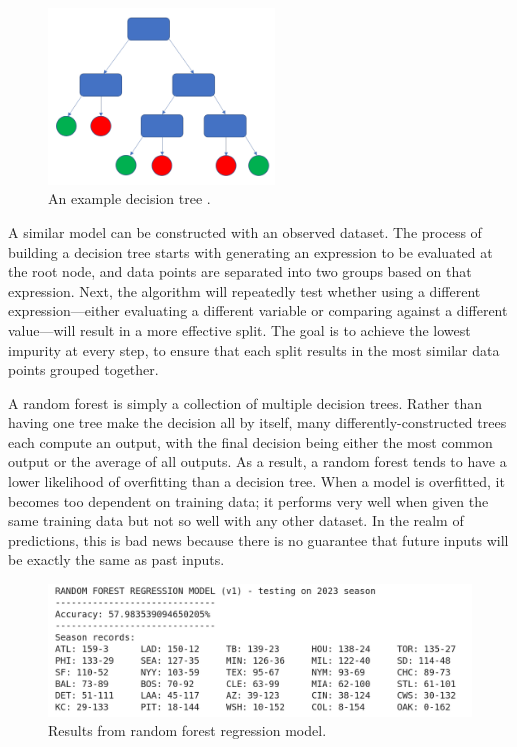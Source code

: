 \documentclass{paper}
\begin{document}
\begin{figure}[H]
  \centering
  \includegraphics[width=6cm]{fig14}
  \caption{An example decision tree \cite{randfor}.}
\end{figure}

A similar model can be constructed with an observed dataset. The process of building a decision tree starts with generating an expression to be evaluated at the root node, and data points are separated into two groups based on that expression. Next, the algorithm will repeatedly test whether using a different expression---either evaluating a different variable or comparing against a different value---will result in a more effective split. The goal is to achieve the lowest impurity at every step, to ensure that each split results in the most similar data points grouped together.

A random forest is simply a collection of multiple decision trees. Rather than having one tree make the decision all by itself, many differently-constructed trees each compute an output, with the final decision being either the most common output or the average of all outputs. As a result, a random forest tends to have a lower likelihood of overfitting than a decision tree. When a model is overfitted, it becomes too dependent on training data; it performs very well when given the same training data but not so well with any other dataset. In the realm of predictions, this is bad news because there is no guarantee that future inputs will be exactly the same as past inputs.

\begin{figure}[H]
  \centering
  \includegraphics[width=13cm]{fig7}
  \caption{Results from random forest regression model.}
\end{figure}
\end{document}
